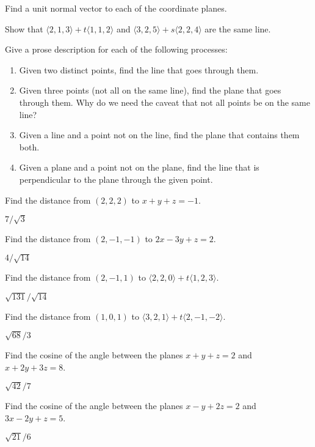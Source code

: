 \begin{enumialphparenastyle}
\begin{ex}
Find a unit normal vector to each of the coordinate planes.
\end{ex}

\begin{ex}
Show that $\langle 2,1,3 \rangle + t \langle 1,1,2 \rangle$ and
$\langle 3, 2, 5 \rangle + s \langle 2, 2, 4 \rangle$ are the same
line.
\end{ex}

\begin{ex}
Give a prose description for each of the following processes:
\begin{enumerate}
\item	Given two distinct points, find the line that goes through them.
\item	Given three points (not all on the same line), find the plane
  that goes through them. Why do we need the caveat that not all
  points be on the same line?
\item	Given a line and a point not on the line, find the plane that
contains them both.
\item	Given a plane and a point not on the plane, find the line that
is perpendicular to the plane through the given point.
\end{enumerate}
\end{ex}

\begin{ex}
Find the distance from $(2,2,2)$ to $x+y+z=-1$.
\begin{sol}
	$7/\sqrt3$
\end{sol}
\end{ex}

\begin{ex}
Find the distance from $(2,-1,-1)$ to $2x-3y+z=2$.
\begin{sol}
	$4/\sqrt{14}$
\end{sol}
\end{ex}

\begin{ex}
Find the distance from $(2,-1,1)$ to 
$\langle 2,2,0\rangle+t\langle 1,2,3\rangle$.
\begin{sol}
	$\sqrt{131}/\sqrt{14}$
\end{sol}
\end{ex}

\begin{ex}
Find the distance from $(1,0,1)$ to 
$\langle 3,2,1\rangle+t\langle 2,-1,-2\rangle$.
\begin{sol}
	$\sqrt{68}/3$
\end{sol}
\end{ex}

\begin{ex}
Find the cosine of the angle
between the planes $x+y+z=2$ and $x+2y+3z=8$.
\begin{sol}
	$\sqrt{42}/7$
\end{sol}
\end{ex}

\begin{ex}
Find the cosine of the angle
between the planes $x-y+2z=2$ and $3x-2y+z=5$.
\begin{sol}
	$\sqrt{21}/6$
\end{sol}
\end{ex}

\end{enumialphparenastyle}